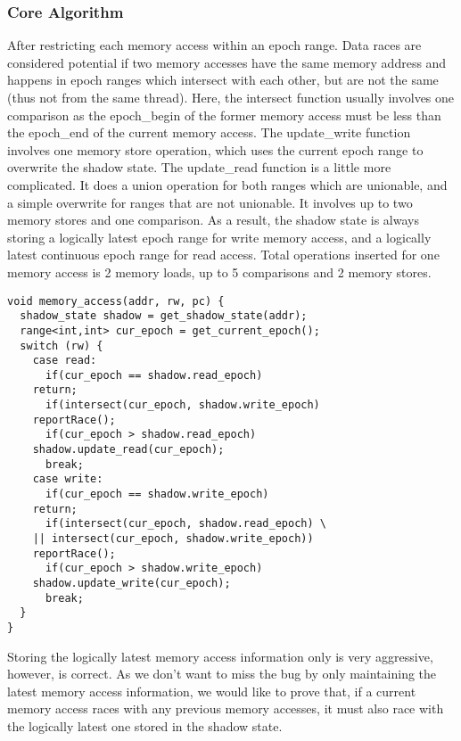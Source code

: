 \subsubsection{Core Algorithm}
After restricting each memory access within an epoch range. Data races are considered potential if 
two memory accesses have the same memory address and happens in epoch ranges which intersect with each other, but are not the same
(thus not from the same thread).
Here, the intersect function usually involves one comparison as the epoch\_begin of the former memory access must be less than the epoch\_end
of the current memory access. The update\_write function involves one memory store operation, which uses the current epoch range to overwrite
the shadow state. The update\_read function is a little more complicated. It does a union operation for both ranges which are unionable, and a simple
overwrite for ranges that are not unionable. It involves up to two memory stores and one comparison. As a result, the shadow state is always storing a logically latest epoch range for write memory access,
and a logically latest continuous epoch range for read access. 
Total operations inserted for one memory access is 2 memory loads, up to 5 comparisons and 2 memory stores.
\lstset{language=C++}
\begin{lstlisting}[caption=Pseudo code for race detection algorithm]
void memory_access(addr, rw, pc) {
  shadow_state shadow = get_shadow_state(addr);
  range<int,int> cur_epoch = get_current_epoch();
  switch (rw) {
    case read:
      if(cur_epoch == shadow.read_epoch)
	return;
      if(intersect(cur_epoch, shadow.write_epoch)
	reportRace();
      if(cur_epoch > shadow.read_epoch)
	shadow.update_read(cur_epoch);
      break;
    case write:
      if(cur_epoch == shadow.write_epoch)
	return;
      if(intersect(cur_epoch, shadow.read_epoch) \
	|| intersect(cur_epoch, shadow.write_epoch))
	reportRace();
      if(cur_epoch > shadow.write_epoch)
	shadow.update_write(cur_epoch);
      break;
  }
}
\end{lstlisting}
Storing the logically latest memory access information only is very aggressive, however, is correct.
As we don't want to miss the bug by only maintaining the latest memory access information, we would like to prove that,
if a current memory access races with any previous memory accesses, it must also race with the logically latest one
stored in the shadow state. 

